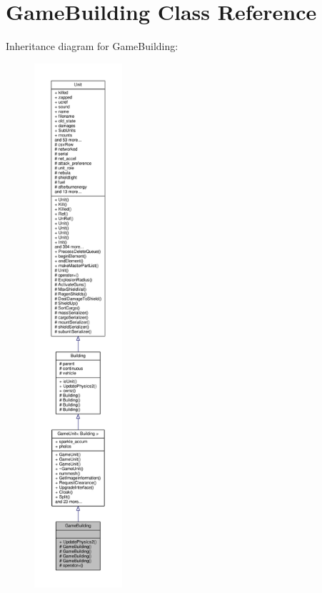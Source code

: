 \hypertarget{classGameBuilding}{}\section{Game\+Building Class Reference}
\label{classGameBuilding}


Inheritance diagram for Game\+Building\+:
\nopagebreak
\begin{figure}[H]
\begin{center}
\leavevmode
\includegraphics[height=550pt]{d8/dbc/classGameBuilding__inherit__graph}
\end{center}
\end{figure}


